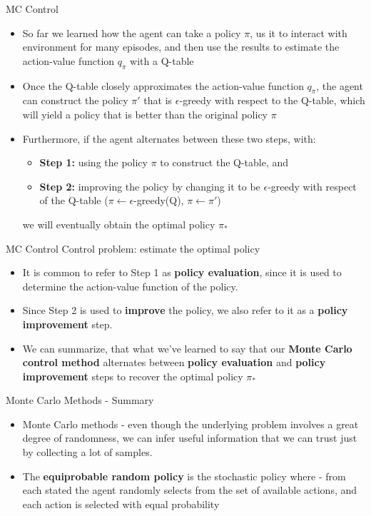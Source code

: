 \documentclass[10pt,mathserif]{beamer}
\begin{document}
\begin{frame}{MC Control}
\begin{itemize}
\item So far we learned how the agent can take a policy $\pi$, us it to interact with environment for many episodes, and then
use the results to estimate the action-value function $q_{\pi}$ with a Q-table
\item Once the Q-table closely approximates the action-value function $q_{\pi}$, the agent can construct the policy $\pi'$ that is
$\epsilon$-greedy with respect to the Q-table, which will yield a policy that is better than the original policy $\pi$
\item Furthermore, if the agent alternates between these two steps, with:
\begin{itemize}
\item \textbf{Step 1:} using the policy $\pi$ to construct the Q-table, and
\item \textbf{Step 2:} improving the policy by changing it to be $\epsilon$-greedy with respect of the Q-table ($\pi \leftarrow \epsilon$-greedy(Q),
$\pi \leftarrow \pi'$)
\end{itemize}
we will eventually obtain the optimal policy $\pi_*$
\end{itemize}
\end{frame}

\begin{frame}{MC Control}
Control problem: estimate the optimal policy
\begin{itemize}
\item It is common to refer to Step 1 as \textbf{policy evaluation}, since it is used to determine the action-value function of the policy.
\item Since Step 2 is used to \textbf{improve} the policy, we also refer to it as a \textbf{policy improvement} step.
\item We can summarize, that what we've learned to say that our \textbf{Monte Carlo control method} alternates between \textbf{policy evaluation} and
\textbf{policy improvement} steps to recover the optimal policy $\pi_*$
\end{itemize}
\end{frame}


\begin{frame}{Monte Carlo Methods - Summary}
\begin{itemize}
\item Monte Carlo methods - even though the underlying problem involves a great degree of randomness, we can infer useful information that we can trust just by collecting a lot of samples.
\item The \textbf{equiprobable random policy} is the stochastic policy where - from each stated the agent randomly
selects from the set of available actions, and each action is selected with equal probability
\end{itemize}
\end{frame}
\end{document}
